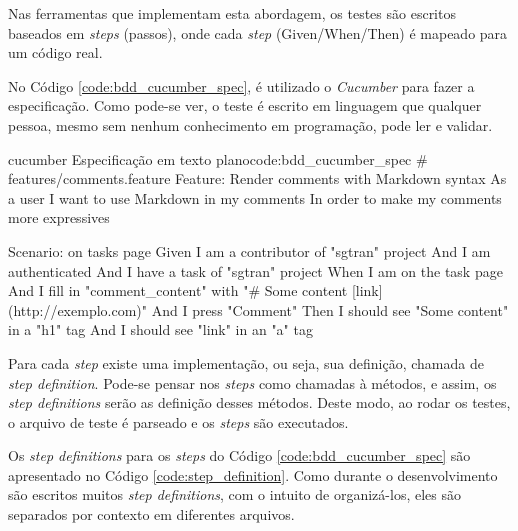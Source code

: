 Nas ferramentas que implementam esta abordagem, os testes são escritos baseados em \textit{steps} (passos), onde cada \textit{step} (Given/When/Then) é mapeado para um código real.

No Código \ref{code:bdd_cucumber_spec}, é utilizado o \textit{Cucumber} para fazer a especificação. Como pode-se ver, o teste é escrito em linguagem que qualquer pessoa, mesmo sem nenhum conhecimento em programação, pode ler e validar.

\begin{mycode}{cucumber}%
{Especificação em texto plano}{code:bdd_cucumber_spec}
# features/comments.feature
Feature: Render comments with Markdown syntax
  As a user
  I want to use Markdown in my comments
  In order to make my comments more expressives

  Scenario: on tasks page
    Given I am a contributor of "sgtran" project
    And I am authenticated
    And I have a task of "sgtran" project
    When I am on the task page
    And I fill in "comment_content" with "# Some content [link](http://exemplo.com)"
    And I press "Comment"
    Then I should see "Some content" in a "h1" tag
    And I should see "link" in an "a" tag
\end{mycode}

Para cada \textit{step} existe uma implementação, ou seja, sua definição, chamada de \textit{step definition}. Pode-se pensar nos \textit{steps} como chamadas à métodos, e assim, os \textit{step definitions} serão as definição desses métodos. Deste modo, ao rodar os testes, o arquivo de teste é parseado e os \textit{steps} são executados.

Os \textit{step definitions} para os \textit{steps} do Código \ref{code:bdd_cucumber_spec} são apresentado no Código \ref{code:step_definition}. Como durante o desenvolvimento são escritos muitos \textit{step definitions}, com o intuito de organizá-los, eles são separados por contexto em diferentes arquivos.

